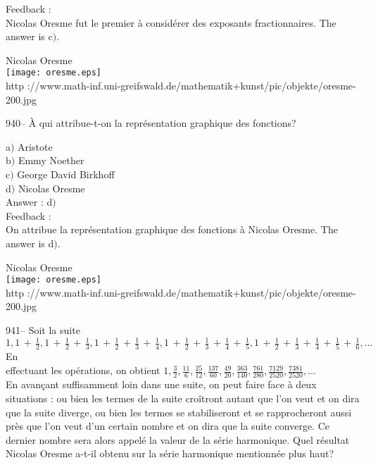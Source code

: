 ﻿\documentclass[letterpaper, 12pt]{article}
\begin{document}
Feedback : \\
Nicolas Oresme fut le premier \`a consid\'erer des exposants
fractionnaires. The answer is c$)$.\\

        \begin{center}
        Nicolas Oresme\\
    \texttt{[image: oresme.eps]}\\
        {\footnotesize http
://www.math-inf.uni-greifswald.de/mathematik+kunst/pic/objekte/oresme-200.jpg}
    \end{center}

940-- \`A qui attribue-t-on la repr\'esentation graphique des
fonctions?

a$)$ Aristote \\
b$)$ Emmy Noether \\
c$)$ George David Birkhoff \\
d$)$ Nicolas Oresme\\

Answer : d$)$\\

Feedback : \\
On attribue la repr\'esentation graphique des fonctions \`a Nicolas Oresme.
The answer is d$)$.\\

        \begin{center}
        Nicolas Oresme\\
    \texttt{[image: oresme.eps]}\\
        {\footnotesize http
://www.math-inf.uni-greifswald.de/mathematik+kunst/pic/objekte/oresme-200.jpg}
    \end{center}

941-- Soit la suite
$1,1\,+\,\frac12,1\,+\,\frac12\,+\,\frac13,1\,+\,\frac12\,+\,\frac13\,+\,\frac14,1\,+\,\frac12\,+\,\frac13\,+\,\frac14\,+\,\frac15,
1\,+\,\frac12\,+\,\frac13\,+\,\frac14\,+\,\frac15\,+\,\frac16,\ldots$ En \\
[2mm] effectuant les op\'erations, on obtient
$1,\frac32,\frac{11}6,\frac{25}{12},\frac{137}{60},\frac{49}{20},
\frac{363}{140},\frac{761}{280},\frac{7129}{2520},\frac{7381}{2520},\ldots$
\\ [2mm] En avan\c cant suffisamment loin dans une suite, on peut
faire face \`a deux situations : ou bien les termes de la suite
cro\^itront autant que l'on veut et on dira que la suite diverge, ou
bien les termes se stabiliseront et se rapprocheront aussi pr\`es
que l'on veut d'un certain nombre et on dira que la suite converge.
Ce dernier nombre sera alors appel\'e la valeur de la s\'erie
harmonique. Quel r\'esultat Nicolas Oresme a-t-il obtenu sur la
s\'erie harmonique mentionn\'ee plus haut?
\end{document}
